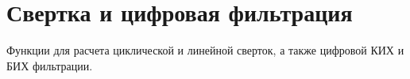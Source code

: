 \hypertarget{group___c_o_n_v___g_r_o_u_p}{}\section{Свертка и цифровая фильтрация}
\label{group___c_o_n_v___g_r_o_u_p}
Функции для расчета циклической и линейной сверток, а также цифровой КИХ и БИХ фильтрации. 